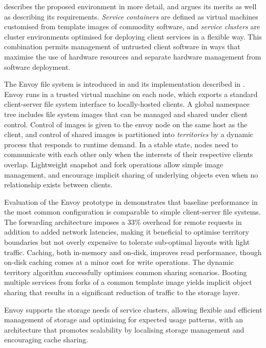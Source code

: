  describes the proposed environment in more detail, and argues its merits as well as describing its requirements. \emph{Service containers} are defined as virtual machines customised from template images of commodity software, and \emph{service clusters} are cluster environments optimised for deploying client services in a flexible way. This combination permits management of untrusted client software in ways that maximise the use of hardware resources and separate hardware management from software deployment.

The Envoy file system is introduced in  and its implementation described in . Envoy runs in a trusted virtual machine on each node, which exports a standard client-server file system interface to locally-hosted clients. A global namespace tree includes file system images that can be managed and shared under client control. Control of images is given to the envoy node on the same host as the client, and control of shared images is partitioned into \emph{territories} by a dynamic process that responds to runtime demand. In a stable state, nodes need to communicate with each other only when the interests of their respective clients overlap. Lightweight snapshot and fork operations allow simple image management, and encourage implicit sharing of underlying objects even when no relationship exists between clients.

Evaluation of the Envoy prototype in  demonstrates that baseline performance in the most common configuration is comparable to simple client-server file systems. The forwarding architecture imposes a 33\% overhead for remote requests in addition to added network latencies, making it beneficial to optimise territory boundaries but not overly expensive to tolerate sub-optimal layouts with light traffic. Caching, both in-memory and on-disk, improves read performance, though on-disk caching comes at a minor cost for write operations. The dynamic territory algorithm successfully optimises common sharing scenarios. Booting multiple services from forks of a common template image yields implicit object sharing that results in a significant reduction of traffic to the storage layer.

Envoy supports the storage needs of service clusters, allowing flexible and efficient management of storage and optimising for expected usage patterns, with an architecture that promotes scalability by localising storage management and encouraging cache sharing.
